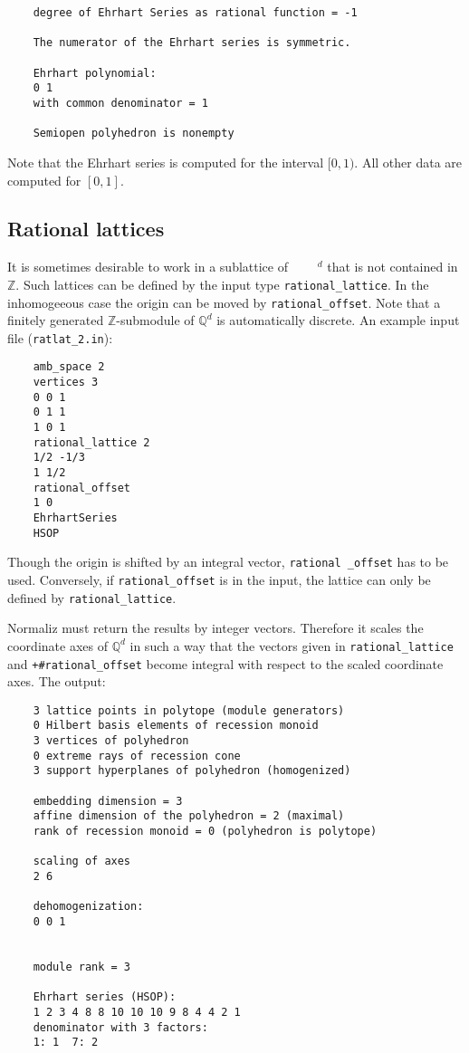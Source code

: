 \documentclass[12pt,a4paper]{scrartcl}
\theoremstyle{definition}
\def\ZZ{{\mathbb Z}}
\def\QQ{{\mathbb Q}}
\begin{document}
{\begin{Verbatim}
	degree of Ehrhart Series as rational function = -1
	
	The numerator of the Ehrhart series is symmetric.
	
	Ehrhart polynomial:
	0 1 
	with common denominator = 1
	
	Semiopen polyhedron is nonempty 
	\end{Verbatim}
	Note that the Ehrhart series is computed for the interval $[0,1)$.  All other data are computed for $[0,1]$.
	
	\subsection{Rational lattices}\label{ratlat}
	
	It is sometimes desirable to work in a sublattice of $\qquad^d$ that is not contained in $\ZZ$. Such lattices can be defined by the input type \verb|rational_lattice|. In the inhomogeeous case the origin can be moved by \verb|rational_offset|. Note that a finitely generated $\ZZ$-submodule of $\QQ^d$ is automatically discrete. An example input file (\verb|ratlat_2.in|):
	\begin{Verbatim}
	amb_space 2
	vertices 3
	0 0 1
	0 1 1
	1 0 1
	rational_lattice 2
	1/2 -1/3
	1 1/2
	rational_offset
	1 0
	EhrhartSeries
	HSOP
	\end{Verbatim}
	Though the origin is shifted by an integral vector, \verb|rational _offset| has to be used. Conversely, if \verb|rational_offset| is in the input, the lattice can only be defined by \verb|rational_lattice|.
	
	Normaliz must return the results by integer vectors. Therefore it scales the coordinate axes of $\QQ^d$ in such a way that the vectors given in \verb|rational_lattice| and \verb|+#rational_offset| become integral with respect to the scaled coordinate axes. 
	The output:
	\begin{Verbatim}
	3 lattice points in polytope (module generators)
	0 Hilbert basis elements of recession monoid
	3 vertices of polyhedron
	0 extreme rays of recession cone
	3 support hyperplanes of polyhedron (homogenized)
	
	embedding dimension = 3
	affine dimension of the polyhedron = 2 (maximal)
	rank of recession monoid = 0 (polyhedron is polytope)
	
	scaling of axes
	2 6 
	
	dehomogenization:
	0 0 1 
	
	
	module rank = 3
	
	Ehrhart series (HSOP):
	1 2 3 4 8 8 10 10 10 9 8 4 4 2 1 
	denominator with 3 factors:
	1: 1  7: 2  
	

\end{Verbatim}}
\end{document}
